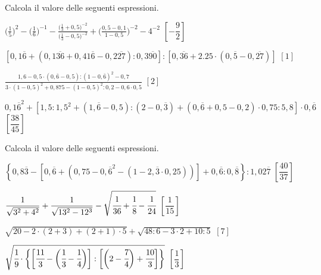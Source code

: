 \begin{esercizio}[\Ast]
\label{ese:3.156}
 Calcola il valore delle seguenti espressioni.
\begin{enumeratea}
\spazielenx
\item $\displaystyle{\bigg(\frac{1}{5}\bigg)^{2}-\bigg(\frac{1}{6}
\bigg)^{-1}-\frac{\bigg(\frac{1}{3}+0,5\bigg)^{-2}}%
{\bigg(\frac{1}{3}-0,5\bigg)^{-2}}+\bigg(\frac{0,5-0,1}{1-0,5}
\bigg)^{-2}-4^{-2}}$
  \hfill \(\left[-\dfrac{9}{2} \right]\)
\item $\displaystyle{\left[0,1\overline{6}+(0,1\overline{36}+0,41
\overline{6}-0,2\overline{27}):0,3\overline{90}\right]:%
\left[0,\overline{36}+2.25\cdot(0,\overline{5}-0,\overline{27})\right]}$
  \hfill \(\left[1 \right]\)
\item $\displaystyle{\frac{1,6-0,5\cdot(0,\overline{6}-0,5):(1-0,
\overline{6})^{2}-0,7}%
{3\cdot(1-0,5)^{2}+0,875-(1-0,5)^{2}:0,2-0,6\cdot0,5}}$
  \hfill \(\left[2 \right]\)
\item $\displaystyle{{0,1\overline{6}}^{2}+\left[1,5:1,5^{2}+\left(1,
\overline{6}-0,5\right):\left(2-0,\overline{3}\right)%
+\left(0,\overline{6}+0,5-0,2\right)\cdot0,75:5,8\right]\cdot 0,
\overline{6}}$
  \hfill \(\left[\dfrac{38}{45} \right]\)
\end{enumeratea}
\end{esercizio}

\begin{esercizio}[\Ast]
\label{ese:3.157}
 Calcola il valore delle seguenti espressioni.
\begin{enumeratea}
\spazielenx
\item $\displaystyle{\left\{0,8\overline{3}-\left[0,\overline{6}+(0,75-{0,
\overline{6}}^{2}-(1-2,\overline{3}\cdot%
0,25))\right]+0,\overline{6}:0,\overline{8}\right\}:1,02\overline{7}}$
  \hfill \(\left[\dfrac{40}{37} \right]\)
\item $\displaystyle{\frac{1}{\sqrt{3^{2}+4^{2}}}+\frac{1}{\sqrt{13^{2}-12^3}}-
\sqrt{\cfrac{1}{36}+\cfrac{1}{8}%
-\cfrac{1}{24}}}$
  \hfill \(\left[\dfrac{1}{15} \right]\)
\item $\displaystyle{\sqrt{20-2\cdot(2+3)+(2+1)\cdot5}+\sqrt{48:6-3
\cdot2+10:5}}$
  \hfill \(\left[7 \right]\)
\item $\displaystyle{\sqrt{\cfrac{1}{9}\cdot\bigg\{\bigg[\cfrac{11}{3}-
\bigg(\cfrac{1}{3}-\cfrac{1}{4}\bigg)\bigg]:%
\bigg[\bigg(2-\cfrac{7}{4}\bigg)+\cfrac{10}{3}\bigg]\bigg\}}}$
  \hfill \(\left[\dfrac{1}{3} \right]\)
\end{enumeratea}
\end{esercizio}


